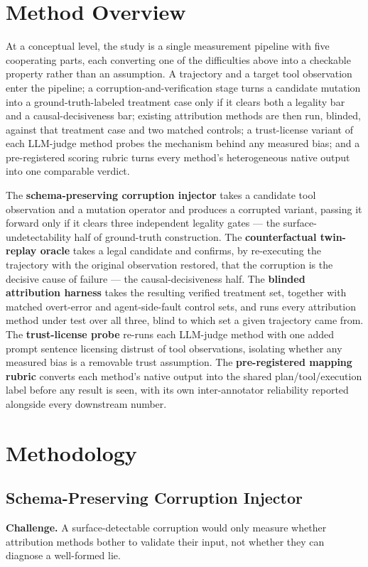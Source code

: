 \documentclass[11pt]{article}
\begin{document}
\section{Method Overview}

At a conceptual level, the study is a single measurement pipeline with five cooperating parts, each converting one of the difficulties above into a checkable property rather than an assumption. A trajectory and a target tool observation enter the pipeline; a corruption-and-verification stage turns a candidate mutation into a ground-truth-labeled treatment case only if it clears both a legality bar and a causal-decisiveness bar; existing attribution methods are then run, blinded, against that treatment case and two matched controls; a trust-license variant of each LLM-judge method probes the mechanism behind any measured bias; and a pre-registered scoring rubric turns every method's heterogeneous native output into one comparable verdict.

The \textbf{schema-preserving corruption injector} takes a candidate tool observation and a mutation operator and produces a corrupted variant, passing it forward only if it clears three independent legality gates --- the surface-undetectability half of ground-truth construction. The \textbf{counterfactual twin-replay oracle} takes a legal candidate and confirms, by re-executing the trajectory with the original observation restored, that the corruption is the decisive cause of failure --- the causal-decisiveness half. The \textbf{blinded attribution harness} takes the resulting verified treatment set, together with matched overt-error and agent-side-fault control sets, and runs every attribution method under test over all three, blind to which set a given trajectory came from. The \textbf{trust-license probe} re-runs each LLM-judge method with one added prompt sentence licensing distrust of tool observations, isolating whether any measured bias is a removable trust assumption. The \textbf{pre-registered mapping rubric} converts each method's native output into the shared plan/tool/execution label before any result is seen, with its own inter-annotator reliability reported alongside every downstream number.

\section{Methodology}

\subsection{Schema-Preserving Corruption Injector}
\textbf{Challenge.} A surface-detectable corruption would only measure whether attribution methods bother to validate their input, not whether they can diagnose a well-formed lie.
\end{document}
